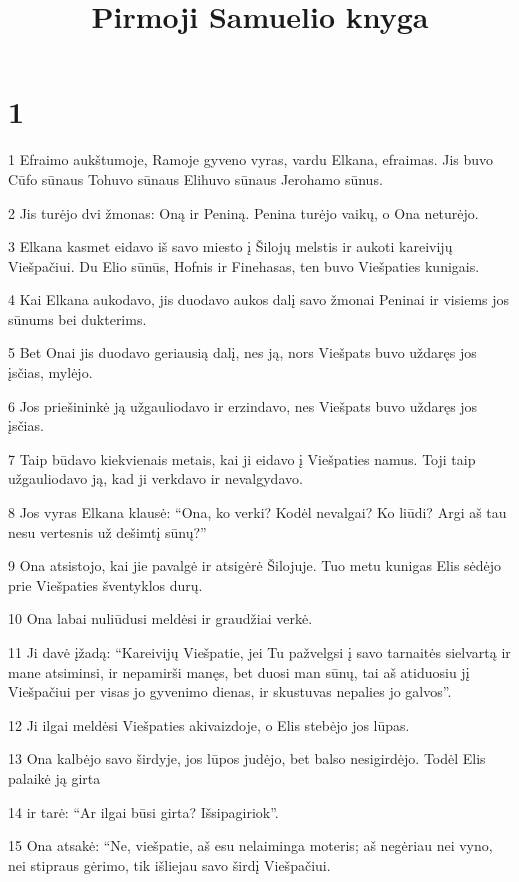 

\title{Pirmoji Samuelio knyga}

\chapter{1}


\par 1 Efraimo aukštumoje, Ramoje gyveno vyras, vardu Elkana, efraimas. Jis buvo Cūfo sūnaus Tohuvo sūnaus Elihuvo sūnaus Jerohamo sūnus. 
\par 2 Jis turėjo dvi žmonas: Oną ir Peniną. Penina turėjo vaikų, o Ona neturėjo. 
\par 3 Elkana kasmet eidavo iš savo miesto į Šilojų melstis ir aukoti kareivijų Viešpačiui. Du Elio sūnūs, Hofnis ir Finehasas, ten buvo Viešpaties kunigais. 
\par 4 Kai Elkana aukodavo, jis duodavo aukos dalį savo žmonai Peninai ir visiems jos sūnums bei dukterims. 
\par 5 Bet Onai jis duodavo geriausią dalį, nes ją, nors Viešpats buvo uždaręs jos įsčias, mylėjo. 
\par 6 Jos priešininkė ją užgauliodavo ir erzindavo, nes Viešpats buvo uždaręs jos įsčias. 
\par 7 Taip būdavo kiekvienais metais, kai ji eidavo į Viešpaties namus. Toji taip užgauliodavo ją, kad ji verkdavo ir nevalgydavo. 
\par 8 Jos vyras Elkana klausė: “Ona, ko verki? Kodėl nevalgai? Ko liūdi? Argi aš tau nesu vertesnis už dešimtį sūnų?” 
\par 9 Ona atsistojo, kai jie pavalgė ir atsigėrė Šilojuje. Tuo metu kunigas Elis sėdėjo prie Viešpaties šventyklos durų. 
\par 10 Ona labai nuliūdusi meldėsi ir graudžiai verkė. 
\par 11 Ji davė įžadą: “Kareivijų Viešpatie, jei Tu pažvelgsi į savo tarnaitės sielvartą ir mane atsiminsi, ir nepamirši manęs, bet duosi man sūnų, tai aš atiduosiu jį Viešpačiui per visas jo gyvenimo dienas, ir skustuvas nepalies jo galvos”. 
\par 12 Ji ilgai meldėsi Viešpaties akivaizdoje, o Elis stebėjo jos lūpas. 
\par 13 Ona kalbėjo savo širdyje, jos lūpos judėjo, bet balso nesigirdėjo. Todėl Elis palaikė ją girta 
\par 14 ir tarė: “Ar ilgai būsi girta? Išsipagiriok”. 
\par 15 Ona atsakė: “Ne, viešpatie, aš esu nelaiminga moteris; aš negėriau nei vyno, nei stipraus gėrimo, tik išliejau savo širdį Viešpačiui. 
